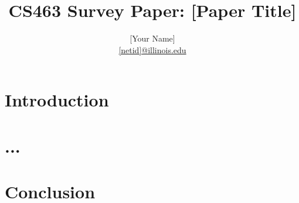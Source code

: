 \documentclass{article}
\title{\vspace{-3.0cm} CS463 Survey Paper: [Paper Title]}
\author{[Your Name] \\
\href{mailto:[netid]@illinois.edu}{[netid]@illinois.edu}}
\date{}
\begin{document}
\maketitle

\begin{multicols}{2}



\begin{abstract}
\blindtext
\end{abstract}


\section{Introduction}

\label{sec:introduction}

\section{...}

\section{Conclusion}

\label{sec:conclusion}

\printbibliography

\end{multicols}
\end{document}
